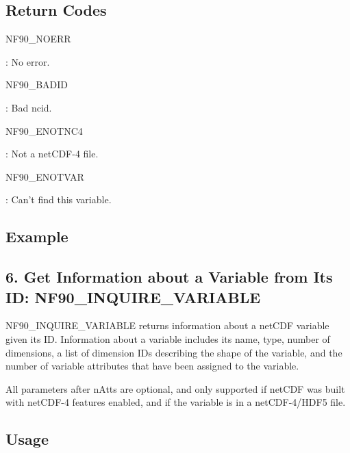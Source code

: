 \subsection*{Return Codes}

{\ttfamily N\+F90\+\_\+\+N\+O\+E\+RR}

\+: No error.

{\ttfamily N\+F90\+\_\+\+B\+A\+D\+ID}

\+: Bad ncid.

{\ttfamily N\+F90\+\_\+\+E\+N\+O\+T\+N\+C4}

\+: Not a net\+C\+D\+F-\/4 file.

{\ttfamily N\+F90\+\_\+\+E\+N\+O\+T\+V\+AR}

\+: Can’t find this variable.

\subsection*{Example}\hypertarget{f90-variables_f90-get-information-about-a-variable-from-its-id-nf90_inquire_variable}{}\subsection{6. Get Information about a Variable from Its I\+D\+: N\+F90\+\_\+\+I\+N\+Q\+U\+I\+R\+E\+\_\+\+V\+A\+R\+I\+A\+B\+L\+E }\label{f90-variables_f90-get-information-about-a-variable-from-its-id-nf90_inquire_variable}
N\+F90\+\_\+\+I\+N\+Q\+U\+I\+R\+E\+\_\+\+V\+A\+R\+I\+A\+B\+LE returns information about a net\+C\+DF variable given its ID. Information about a variable includes its name, type, number of dimensions, a list of dimension I\+Ds describing the shape of the variable, and the number of variable attributes that have been assigned to the variable.

All parameters after n\+Atts are optional, and only supported if net\+C\+DF was built with net\+C\+D\+F-\/4 features enabled, and if the variable is in a net\+C\+D\+F-\/4/\+H\+D\+F5 file.

\subsection*{Usage}


